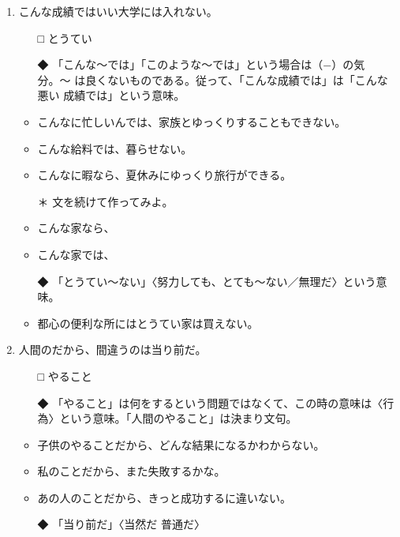 \documentclass[
uplatex,
b5paper,
10pt,
dvipdfmx
]{jsbook}
\begin{document}
\begin{enumerate}
\item こんな成績では\underline{\hspace{3zw}}いい大学には入れない。
\begin{itemize}
\item[□] とうてい
\item[◆] 「こんな〜では」「このような〜では」という場合は（−）の気分。〜
	  は良くないものである。従って、「こんな成績では」は「こんな悪い
	  成績では」という意味。
\end{itemize}
\begin{itemize}
 \item こんなに忙しいんでは、家族とゆっくりすることもできない。
 \item こんな給料では、暮らせない。
 \item こんなに暇なら、夏休みにゆっくり旅行ができる。 
\end{itemize}
\begin{itemize}
 \item[＊] 文を続けて作ってみよ。
 \item こんな家なら、\underline{\hspace{3zw}}
 \item こんな家では、\underline{\hspace{3zw}}
\end{itemize}
\begin{itemize}
 \item[◆] 「とうてい〜ない」〈努力しても、とても〜ない／無理だ〉という意味。
 \item 都心の便利な所にはとうてい家は買えない。 
\end{itemize}

\item 人間の\underline{\hspace{3zw}}だから、間違うのは当り前だ。
\begin{itemize}
\item[□] やること
\item[◆] 「やること」は何をするという問題ではなくて、この時の意味は〈行
	  為〉という意味。「人間のやること」は決まり文句。
\end{itemize}
\begin{itemize}
 \item 子供のやることだから、どんな結果になるかわからない。
 \item 私のことだから、また失敗するかな。
 \item あの人のことだから、きっと成功するに違いない。 
\end{itemize}
\begin{itemize}
\item[◆] 「当り前だ」〈当然だ 普通だ〉
\end{itemize}


\end{enumerate}
\end{document}
